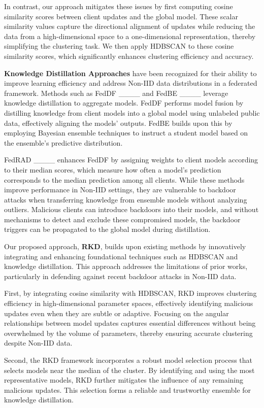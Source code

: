 In contrast, our approach mitigates these issues by first computing cosine similarity scores between client updates and the global model. These scalar similarity values capture the directional alignment of updates while reducing the data from a high-dimensional space to a one-dimensional representation, thereby simplifying the clustering task. We then apply HDBSCAN to these cosine similarity scores, which significantly enhances clustering efficiency and accuracy. 

\textbf{Knowledge Distillation Approaches} have been recognized for their ability to improve learning efficiency and address Non-IID data distributions in a federated framework. Methods such as FedDF ____ and FedBE ____ leverage knowledge distillation to aggregate models. FedDF performs model fusion by distilling knowledge from client models into a global model using unlabeled public data, effectively aligning the models’ outputs. FedBE builds upon this by employing Bayesian ensemble techniques to instruct a student model based on the ensemble’s predictive distribution.

FedRAD ____ enhances FedDF by assigning weights to client models according to their median scores, which measure how often a model's prediction corresponds to the median prediction among all clients. While these methods improve performance in Non-IID settings, they are vulnerable to backdoor attacks when transferring knowledge from ensemble models without analyzing outliers. Malicious clients can introduce backdoors into their models, and without mechanisms to detect and exclude these compromised models, the backdoor triggers can be propagated to the global model during distillation.

Our proposed approach, \textbf{RKD}, builds upon existing methods by innovatively integrating and enhancing foundational techniques such as HDBSCAN and knowledge distillation. This approach addresses the limitations of prior works, particularly in defending against recent backdoor attacks in Non-IID data.

First, by integrating cosine similarity with HDBSCAN, RKD improves clustering efficiency in high-dimensional parameter spaces, effectively identifying malicious updates even when they are subtle or adaptive. Focusing on the angular relationships between model updates captures essential differences without being overwhelmed by the volume of parameters, thereby ensuring accurate clustering despite Non-IID data.

Second, the RKD framework incorporates a robust model selection process that selects models near the median of the cluster. By identifying and using the most representative models, RKD further mitigates the influence of any remaining malicious updates. This selection forms a reliable and trustworthy ensemble for knowledge distillation.

